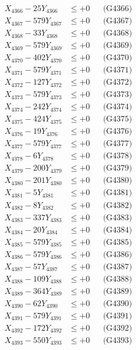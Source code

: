 \documentclass[a4paper,10pt]{article}
\begin{document}
{\begin{align}
X_{4366} - 25Y_{4366} &\leq +0 && \text{(G4366)} \\
X_{4367} - 579Y_{4367} &\leq +0 && \text{(G4367)} \\
X_{4368} - 33Y_{4368} &\leq +0 && \text{(G4368)} \\
X_{4369} - 579Y_{4369} &\leq +0 && \text{(G4369)} \\
X_{4370} - 402Y_{4370} &\leq +0 && \text{(G4370)} \\
\allowbreak
X_{4371} - 579Y_{4371} &\leq +0 && \text{(G4371)} \\
X_{4372} - 127Y_{4372} &\leq +0 && \text{(G4372)} \\
X_{4373} - 579Y_{4373} &\leq +0 && \text{(G4373)} \\
X_{4374} - 242Y_{4374} &\leq +0 && \text{(G4374)} \\
X_{4375} - 424Y_{4375} &\leq +0 && \text{(G4375)} \\
X_{4376} - 19Y_{4376} &\leq +0 && \text{(G4376)} \\
X_{4377} - 579Y_{4377} &\leq +0 && \text{(G4377)} \\
X_{4378} - 6Y_{4378} &\leq +0 && \text{(G4378)} \\
X_{4379} - 200Y_{4379} &\leq +0 && \text{(G4379)} \\
X_{4380} - 201Y_{4380} &\leq +0 && \text{(G4380)} \\
\allowbreak
X_{4381} - 5Y_{4381} &\leq +0 && \text{(G4381)} \\
X_{4382} - 8Y_{4382} &\leq +0 && \text{(G4382)} \\
X_{4383} - 337Y_{4383} &\leq +0 && \text{(G4383)} \\
X_{4384} - 20Y_{4384} &\leq +0 && \text{(G4384)} \\
X_{4385} - 579Y_{4385} &\leq +0 && \text{(G4385)} \\
X_{4386} - 579Y_{4386} &\leq +0 && \text{(G4386)} \\
X_{4387} - 57Y_{4387} &\leq +0 && \text{(G4387)} \\
X_{4388} - 109Y_{4388} &\leq +0 && \text{(G4388)} \\
X_{4389} - 364Y_{4389} &\leq +0 && \text{(G4389)} \\
X_{4390} - 62Y_{4390} &\leq +0 && \text{(G4390)} \\
\allowbreak
X_{4391} - 579Y_{4391} &\leq +0 && \text{(G4391)} \\
X_{4392} - 172Y_{4392} &\leq +0 && \text{(G4392)} \\
X_{4393} - 550Y_{4393} &\leq +0 && \text{(G4393)} \\

\end{align}}
\end{document}
